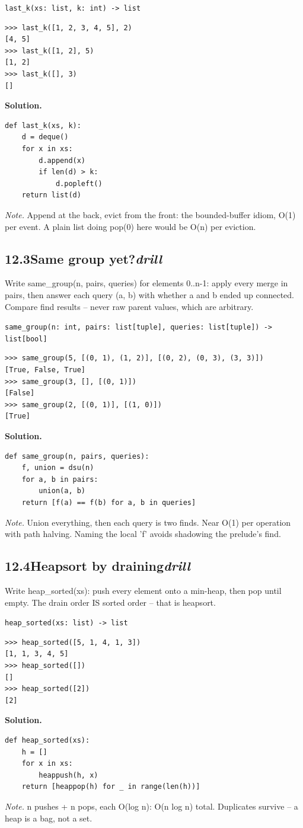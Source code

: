 \documentclass[10pt,letterpaper]{book}
\begin{document}
\noindent\texttt{last\_k(xs: list, k: int) -> list}
\begin{lstlisting}[style=ex]
>>> last_k([1, 2, 3, 4, 5], 2)
[4, 5]
>>> last_k([1, 2], 5)
[1, 2]
>>> last_k([], 3)
[]
\end{lstlisting}
\noindent\textbf{Solution.}
\begin{lstlisting}[style=code]
def last_k(xs, k):
    d = deque()
    for x in xs:
        d.append(x)
        if len(d) > k:
            d.popleft()
    return list(d)
\end{lstlisting}
\noindent\textit{Note.} Append at the back, evict from the front: the bounded-buffer idiom, O(1) per event. A plain list doing pop(0) here would be O(n) per eviction.

\subsection*{12.3\quad Same group yet?\hfill\textnormal{\textit{drill}}}
Write same\_group(n, pairs, queries) for elements 0..n-1: apply every merge in pairs, then answer each query (a, b) with whether a and b ended up connected. Compare find results -- never raw parent values, which are arbitrary.

\noindent\texttt{same\_group(n: int, pairs: list[tuple], queries: list[tuple]) -> list[bool]}
\begin{lstlisting}[style=ex]
>>> same_group(5, [(0, 1), (1, 2)], [(0, 2), (0, 3), (3, 3)])
[True, False, True]
>>> same_group(3, [], [(0, 1)])
[False]
>>> same_group(2, [(0, 1)], [(1, 0)])
[True]
\end{lstlisting}
\noindent\textbf{Solution.}
\begin{lstlisting}[style=code]
def same_group(n, pairs, queries):
    f, union = dsu(n)
    for a, b in pairs:
        union(a, b)
    return [f(a) == f(b) for a, b in queries]
\end{lstlisting}
\noindent\textit{Note.} Union everything, then each query is two finds. Near O(1) per operation with path halving. Naming the local 'f' avoids shadowing the prelude's find.

\subsection*{12.4\quad Heapsort by draining\hfill\textnormal{\textit{drill}}}
Write heap\_sorted(xs): push every element onto a min-heap, then pop until empty. The drain order IS sorted order -- that is heapsort.

\noindent\texttt{heap\_sorted(xs: list) -> list}
\begin{lstlisting}[style=ex]
>>> heap_sorted([5, 1, 4, 1, 3])
[1, 1, 3, 4, 5]
>>> heap_sorted([])
[]
>>> heap_sorted([2])
[2]
\end{lstlisting}
\noindent\textbf{Solution.}
\begin{lstlisting}[style=code]
def heap_sorted(xs):
    h = []
    for x in xs:
        heappush(h, x)
    return [heappop(h) for _ in range(len(h))]
\end{lstlisting}
\noindent\textit{Note.} n pushes + n pops, each O(log n): O(n log n) total. Duplicates survive -- a heap is a bag, not a set.
\end{document}
